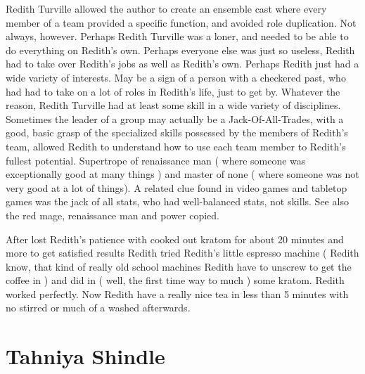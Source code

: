 \documentclass[12pt]{book}
\begin{document}
Redith Turville allowed the author to create an ensemble cast where every member of a team provided a specific function, and avoided role duplication. Not always, however. Perhaps Redith Turville was a loner, and needed to be able to do everything on Redith's own. Perhaps everyone else was just so useless, Redith had to take over Redith's jobs as well as Redith's own. Perhaps Redith just had a wide variety of interests. May be a sign of a person with a checkered past, who had had to take on a lot of roles in Redith's life, just to get by. Whatever the reason, Redith Turville had at least some skill in a wide variety of disciplines. Sometimes the leader of a group may actually be a Jack-Of-All-Trades, with a good, basic grasp of the specialized skills possessed by the members of Redith's team, allowed Redith to understand how to use each team member to Redith's fullest potential. Supertrope of renaissance man ( where someone was exceptionally good at many things ) and master of none ( where someone was not very good at a lot of things). A related clue found in video games and tabletop games was the jack of all stats, who had well-balanced stats, not skills. See also the red mage, renaissance man and power copied.



After lost Redith's patience with cooked out kratom for about 20 minutes and more to get satisfied results Redith tried Redith's little espresso machine ( Redith know, that kind of really old school machines Redith have to unscrew to get the coffee in ) and did in ( well, the first time way to much ) some kratom. Redith worked perfectly. Now Redith have a really nice tea in less than 5 minutes with no stirred or much of a washed afterwards.



\chapter{Tahniya Shindle}
\end{document}
